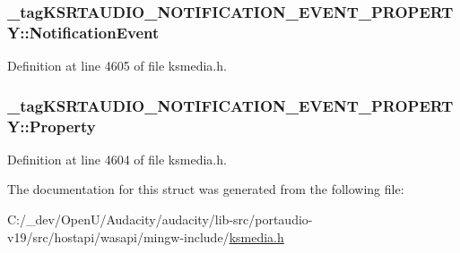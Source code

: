 \subsubsection[{\texorpdfstring{Notification\+Event}{NotificationEvent}}]{ \+\_\+tag\+K\+S\+R\+T\+A\+U\+D\+I\+O\+\_\+\+N\+O\+T\+I\+F\+I\+C\+A\+T\+I\+O\+N\+\_\+\+E\+V\+E\+N\+T\+\_\+\+P\+R\+O\+P\+E\+R\+T\+Y\+::\+Notification\+Event}\hypertarget{struct__tag_k_s_r_t_a_u_d_i_o___n_o_t_i_f_i_c_a_t_i_o_n___e_v_e_n_t___p_r_o_p_e_r_t_y_a97f285b125a57090b52ac2b767f612a6}{}\label{struct__tag_k_s_r_t_a_u_d_i_o___n_o_t_i_f_i_c_a_t_i_o_n___e_v_e_n_t___p_r_o_p_e_r_t_y_a97f285b125a57090b52ac2b767f612a6}


Definition at line 4605 of file ksmedia.\+h.

\subsubsection[{\texorpdfstring{Property}{Property}}]{ \+\_\+tag\+K\+S\+R\+T\+A\+U\+D\+I\+O\+\_\+\+N\+O\+T\+I\+F\+I\+C\+A\+T\+I\+O\+N\+\_\+\+E\+V\+E\+N\+T\+\_\+\+P\+R\+O\+P\+E\+R\+T\+Y\+::\+Property}\hypertarget{struct__tag_k_s_r_t_a_u_d_i_o___n_o_t_i_f_i_c_a_t_i_o_n___e_v_e_n_t___p_r_o_p_e_r_t_y_acab8142aad03c3ad718684eb5c363797}{}\label{struct__tag_k_s_r_t_a_u_d_i_o___n_o_t_i_f_i_c_a_t_i_o_n___e_v_e_n_t___p_r_o_p_e_r_t_y_acab8142aad03c3ad718684eb5c363797}


Definition at line 4604 of file ksmedia.\+h.



The documentation for this struct was generated from the following file\+:\begin{DoxyCompactItemize}
\item 
C\+:/\+\_\+dev/\+Open\+U/\+Audacity/audacity/lib-\/src/portaudio-\/v19/src/hostapi/wasapi/mingw-\/include/\hyperlink{ksmedia_8h}{ksmedia.\+h}\end{DoxyCompactItemize}
